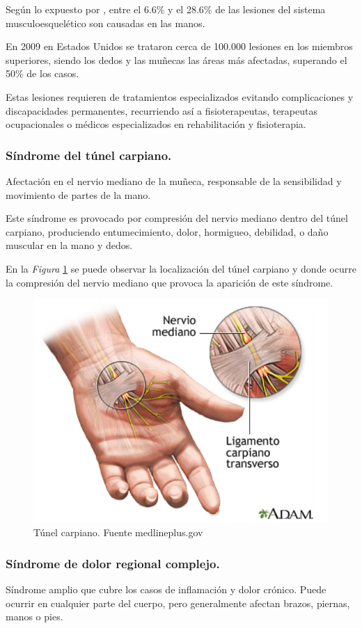 Según lo expuesto por \cite{arroyo-berezowsky_epidemiology_2021}, entre el 6.6\% y el 28.6\% de las lesiones del sistema musculoesquelético son causadas en las manos.

En 2009 en Estados Unidos se trataron cerca de 100.000 lesiones en los miembros superiores, siendo los dedos y las muñecas las áreas más afectadas, superando el 50\% de los casos. \cite{arroyo-berezowsky_epidemiology_2021}

Estas lesiones requieren de tratamientos especializados evitando complicaciones y discapacidades permanentes, recurriendo así a fisioterapeutas, terapeutas ocupacionales o médicos especializados en rehabilitación y fisioterapia.  
\cite{arroyo-berezowsky_epidemiology_2021}
\subsubsection{Síndrome del túnel carpiano.}
Afectación en el nervio mediano de la muñeca, responsable de la sensibilidad y movimiento de partes de la mano.\cite{sindrome_tunel}

Este síndrome es provocado por compresión del nervio  mediano dentro del túnel carpiano, produciendo entumecimiento, dolor, hormigueo, debilidad, o daño muscular en la mano y dedos. \cite{sindrome_tunel}

En la \textit{Figura} \ref{fig:Tunel_carpiano} se puede observar la localización del túnel carpiano y donde ocurre la compresión del nervio mediano que provoca la aparición de este síndrome. \cite{sindrome_tunel}
\begin{figure}
    \centering
    \includegraphics[width=0.5\linewidth]{img/Tunel_carpiano.png}
    \caption{Túnel carpiano. Fuente medlineplus.gov}
    \label{fig:Tunel_carpiano}
\end{figure}
\subsubsection{Síndrome de dolor regional complejo.}
Síndrome amplio que cubre los casos de inflamación y dolor crónico. Puede ocurrir en cualquier parte del cuerpo, pero generalmente afectan brazos, piernas, manos o pies.  \cite{sindrome_regional_comple}

